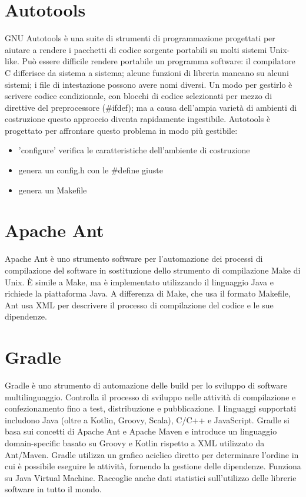 \documentclass[a4paper,12pt,titlepage,oneside]{book}
\begin{document}
\section{Autotools}
GNU Autotools è una suite di strumenti di programmazione progettati per aiutare a rendere i pacchetti di codice sorgente portabili su molti sistemi Unix-like.
Può essere difficile rendere portabile un programma software: il compilatore C differisce da sistema a sistema; alcune funzioni di libreria mancano su alcuni sistemi; i file di intestazione possono avere nomi diversi. 
Un modo per gestirlo è scrivere codice condizionale, con blocchi di codice selezionati per mezzo di direttive del preprocessore (\#ifdef); ma a causa dell'ampia varietà di ambienti di costruzione questo approccio diventa rapidamente ingestibile. 
Autotools è progettato per affrontare questo problema in modo più gestibile:
\begin{itemize}
    \item 'configure' verifica le caratteristiche dell’ambiente di costruzione
    \item genera un config.h con le \#define giuste
    \item genera un Makefile
\end{itemize}

\section{Apache Ant}
Apache Ant è uno strumento software per l'automazione dei processi di compilazione del software in sostituzione dello strumento di compilazione Make di Unix. È simile a Make, ma è implementato utilizzando il linguaggio 
Java e richiede la piattaforma Java. A differenza di Make, che usa il formato Makefile, Ant usa XML per descrivere il processo di compilazione del codice e le sue dipendenze.

\section{Gradle}
Gradle è uno strumento di automazione delle build per lo sviluppo di software multilinguaggio. Controlla il processo di sviluppo nelle attività di compilazione e confezionamento fino a test, distribuzione e pubblicazione. 
I linguaggi supportati includono Java (oltre a Kotlin, Groovy, Scala), C/C++ e JavaScript.
Gradle si basa sui concetti di Apache Ant e Apache Maven e introduce un linguaggio domain-specific basato su Groovy e Kotlin rispetto a XML utilizzato da Ant/Maven. Gradle utilizza un grafico aciclico diretto per determinare 
l'ordine in cui è possibile eseguire le attività, fornendo la gestione delle dipendenze. Funziona su Java Virtual Machine.
Raccoglie anche dati statistici sull'utilizzo delle librerie software in tutto il mondo.
\end{document}
